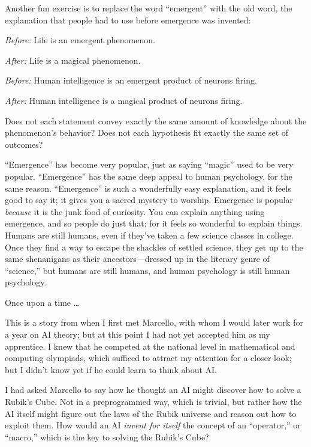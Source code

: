 {
 Another fun exercise is to replace the word
``emergent'' with the old word, the
explanation that people had to use before emergence was invented:}

{
 \textit{Before:} Life is an emergent phenomenon.}

{
 \textit{After:} Life is a magical phenomenon.}

{
 \textit{Before:} Human intelligence is an emergent product of
neurons firing.}

{
 \textit{After:} Human intelligence is a magical product of neurons
firing.}

{
 Does not each statement convey exactly the same amount of
knowledge about the phenomenon's behavior? Does not
each hypothesis fit exactly the same set of outcomes?}

{
 ``Emergence'' has become very
popular, just as saying ``magic''
used to be very popular.
``Emergence'' has the same deep
appeal to human psychology, for the same reason.
``Emergence'' is such a wonderfully
easy explanation, and it feels good to say it; it gives you a sacred
mystery to worship. Emergence is popular \textit{because} it is the
junk food of curiosity. You can explain anything using emergence, and
so people do just that; for it feels so wonderful to explain things.
Humans are still humans, even if they've taken a few
science classes in college. Once they find a way to escape the shackles
of settled science, they get up to the same shenanigans as their
ancestors---dressed up in the literary genre of
``science,'' but humans are still
humans, and human psychology is still human psychology.}

\myendsectiontext


{
 Once upon a time \ldots }

{
 This is a story from when I first met Marcello, with whom I would
later work for a year on AI theory; but at this point I had not yet
accepted him as my apprentice. I knew that he competed at the national
level in mathematical and computing olympiads, which sufficed to
attract my attention for a closer look; but I didn't
know yet if he could learn to think about AI.}

{
 I had asked Marcello to say how he thought an AI might discover
how to solve a Rubik's Cube. Not in a preprogrammed
way, which is trivial, but rather how the AI itself might figure out
the laws of the Rubik universe and reason out how to exploit them. How
would an AI \textit{invent for itself} the concept of an
``operator,'' or
``macro,'' which is the key to
solving the Rubik's Cube?}

